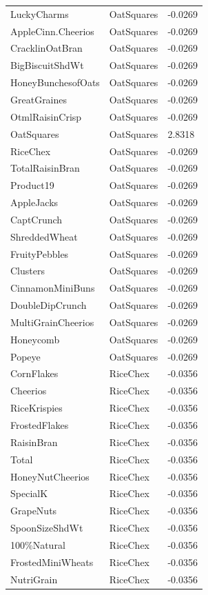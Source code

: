 \begin{table}[!htbp]
\begin{tabular}{lll}
LuckyCharms & OatSquares & -0.0269
\\
AppleCinn.Cheerios & OatSquares & -0.0269
\\
CracklinOatBran & OatSquares & -0.0269
\\
BigBiscuitShdWt & OatSquares & -0.0269
\\
HoneyBunchesofOats & OatSquares & -0.0269
\\
GreatGraines & OatSquares & -0.0269
\\
OtmlRaisinCrisp & OatSquares & -0.0269
\\
OatSquares & OatSquares & 2.8318
\\
RiceChex & OatSquares & -0.0269
\\
TotalRaisinBran & OatSquares & -0.0269
\\
Product19 & OatSquares & -0.0269
\\
AppleJacks & OatSquares & -0.0269
\\
CaptCrunch & OatSquares & -0.0269
\\
ShreddedWheat & OatSquares & -0.0269
\\
FruityPebbles & OatSquares & -0.0269
\\
Clusters & OatSquares & -0.0269
\\
CinnamonMiniBuns & OatSquares & -0.0269
\\
DoubleDipCrunch & OatSquares & -0.0269
\\
MultiGrainCheerios & OatSquares & -0.0269
\\
Honeycomb & OatSquares & -0.0269
\\
Popeye & OatSquares & -0.0269
\\
CornFlakes & RiceChex & -0.0356
\\
Cheerios & RiceChex & -0.0356
\\
RiceKrispies & RiceChex & -0.0356
\\
FrostedFlakes & RiceChex & -0.0356
\\
RaisinBran & RiceChex & -0.0356
\\
Total & RiceChex & -0.0356
\\
HoneyNutCheerios & RiceChex & -0.0356
\\
SpecialK & RiceChex & -0.0356
\\
GrapeNuts & RiceChex & -0.0356
\\
SpoonSizeShdWt & RiceChex & -0.0356
\\
100\%Natural & RiceChex & -0.0356
\\
FrostedMiniWheats & RiceChex & -0.0356
\\
NutriGrain & RiceChex & -0.0356

\end{tabular}
\end{table}
